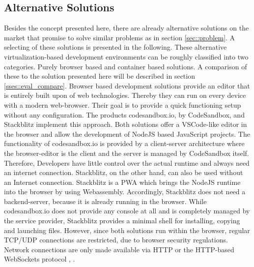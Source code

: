 \subsection{Alternative Solutions}\label{ssec::alternatives}
Besides the concept presented here, there are already alternative solutions on the market that promise to solve similar problems as in section \ref{sec::problem}. A selecting of these solutions is presented in the following. These alternative virtualization-based development environments can be roughly classified into two categories. Purely browser based and container based solutions. A comparison of these to the solution presented here will be described in section \ref{sses::eval_compare}.
Browser based development solutions provide an editor that is entirely built upon of web technologies. Thereby they can run on every device with a modern web-browser. Their goal is to provide a quick functioning setup without any configuration.\newline
The products codesandbox.io, by CodeSandbox, and Stackblitz implement this approach. Both solutions offer a \ac{VSCode}-like editor in the browser and allow the development of NodeJS based JavaScript projects.
The functionality of codesandbox.io is provided by a client-server architecture where the browser-editor is the client and the server is managed by CodeSandbox itself. Therefore, Developers have little control over the actual runtime and always need an internet connection. Stackblitz, on the other hand, can also be used without an Internet connection. Stackblitz is a \ac{PWA} which brings the NodeJS runtime into the browser by using Webassembly. Accordingly, Stackblitz does not need a backend-server, because it is already running in the browser. While codesandbox.io does not provide any console at all and is completely managed by the service provider, Stackblitz provides a minimal shell for installing, copying and launching files. However, since both solutions run within the browser, regular TCP/UDP connections are restricted, due to browser security regulations.  Network connections are only made available via HTTP or the HTTP-based WebSockets protocol \cite{codesandbox}, \cite{stackblitz}.

